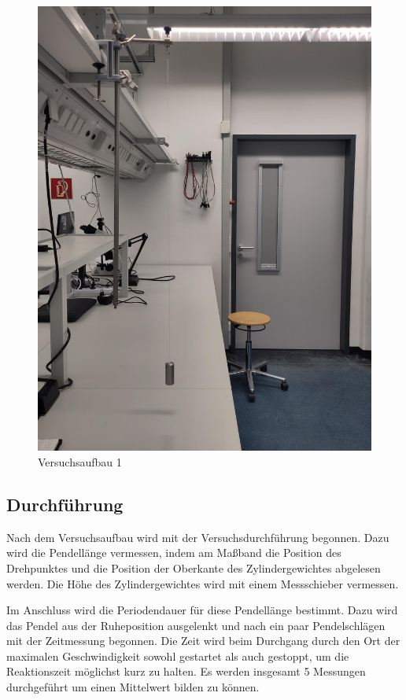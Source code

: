 \documentclass[
  9pt,
]{article}
\begin{document}
\begin{figure}
\centering
\includegraphics[width=\textwidth,height=0.2\textheight]{Bilder/1.jpeg}
\caption{Versuchsaufbau 1}
\end{figure}

\hypertarget{durchfuxfchrung}{%
\subsection{Durchführung}\label{durchfuxfchrung}}

Nach dem Versuchsaufbau wird mit der Versuchsdurchführung begonnen. Dazu
wird die Pendellänge vermessen, indem am Maßband die Position des
Drehpunktes und die Position der Oberkante des Zylindergewichtes
abgelesen werden. Die Höhe des Zylindergewichtes wird mit einem
Messschieber vermessen.

Im Anschluss wird die Periodendauer für diese Pendellänge bestimmt. Dazu
wird das Pendel aus der Ruheposition ausgelenkt und nach ein paar
Pendelschlägen mit der Zeitmessung begonnen. Die Zeit wird beim
Durchgang durch den Ort der maximalen Geschwindigkeit sowohl gestartet
als auch gestoppt, um die Reaktionszeit möglichst kurz zu halten. Es
werden insgesamt 5 Messungen durchgeführt um einen Mittelwert bilden zu
können.
\end{document}
